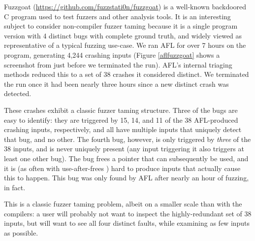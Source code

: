   Fuzzgoat (\url{https://github.com/fuzzstati0n/fuzzgoat}) is a well-known backdoored C program used to test fuzzers and other analysis tools.  It is an interesting subject to consider non-compiler fuzzer taming because it is a single program version with 4 distinct bugs with complete ground truth, and widely viewed as representative of a typical fuzzing use-case.  We ran AFL \cite{aflfuzz} for over 7 hours on the program, generating 4,244 crashing inputs (Figure \ref{aflfuzzgoat} shows a screenshot from just before we terminated the run).  AFL's internal triaging methods reduced this to a set of 38 crashes it considered distinct.  We terminated the run once it had been nearly three hours since a new distinct crash was detected.

  These crashes exhibit a classic fuzzer taming structure.  Three of the bugs are easy to identify: they are triggered by 15, 14, and 11 of the 38 AFL-produced crashing inputs, respectively, and all have multiple inputs that uniquely detect that bug, and no other.  The fourth bug, however, is only triggered by \emph{three} of the 38 inputs, and is never uniquely present (any input triggering it also triggers at least one other bug).  The bug frees a pointer that can subsequently be used, and it is (as often with use-after-frees \cite{DangSan}) hard to produce inputs that actually cause this to happen. This bug was only found by AFL after nearly an hour of fuzzing, in fact.

  This is a classic fuzzer taming problem, albeit on a smaller scale than with the compilers:  a user will probably not want to inspect the highly-redundant set of 38 inputs, but will want to see all four distinct faults, while examining as few inputs as possible.

